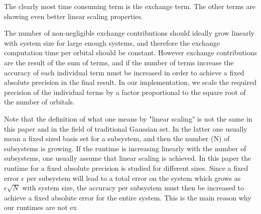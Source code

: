 \documentclass{article}
\begin{document}


The clearly most time consuming term is the exchange term. The other terms are showing even better linear scaling properties.

The number of non-negligible exchange contributions should ideally grow linearly with system size for large enough systems, and therefore the exchange computation time per orbital should be constant. However exchange contributions are the result of the sum of terms, and if the number of terms increase the accuracy of each individual term must be increased in order to achieve a fixed absolute precision in the final result. In our implementation, we scale the required precision of the individual terms by a factor proportional to the square root of the number of orbitals.

Note that the definition of what one means by "linear scaling" is not the same in this paper and in the field of traditional Gaussian set. In the latter one usually mean a fixed sized basis set for a subsystem, and then the number (N) of subsystems is growing. If the runtime is increasing linearly with the number of subsystems, one usually assume that linear scaling is achieved. In this paper the runtime for a fixed absolute precision is studied for different sizes. Since a fixed error $\epsilon$ per subsystem will lead to a total error on the system which grows as $\epsilon \sqrt{N} $ with system size, the accuracy per subsystem must then be increased to achieve a fixed absolute error for the entire system. This is the main reason why our runtimes are not ex
\end{document}
